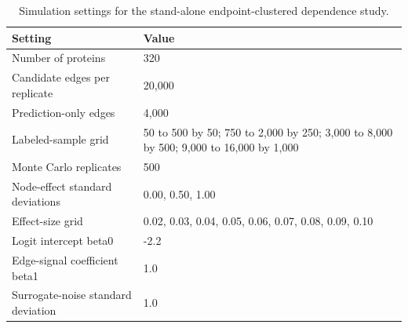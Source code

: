 \begin{table}[ht]
\centering
\small
\begin{tabular}{@{}ll@{}}
\toprule
Setting & Value \\
\midrule
Number of proteins & 320 \\
Candidate edges per replicate & 20,000 \\
Prediction-only edges & 4,000 \\
Labeled-sample grid & 50 to 500 by 50; 750 to 2,000 by 250; 3,000 to 8,000 by 500; 9,000 to 16,000 by 1,000 \\
Monte Carlo replicates & 500 \\
Node-effect standard deviations & 0.00, 0.50, 1.00 \\
Effect-size grid & 0.02, 0.03, 0.04, 0.05, 0.06, 0.07, 0.08, 0.09, 0.10 \\
Logit intercept beta0 & -2.2 \\
Edge-signal coefficient beta1 & 1.0 \\
Surrogate-noise standard deviation & 1.0 \\
\bottomrule
\end{tabular}
\caption[Simulation settings for the endpoint-clustered study]{Simulation settings for the stand-alone endpoint-clustered dependence study.}
\label{tab:sim_endpoint_cluster_settings}
\end{table}
